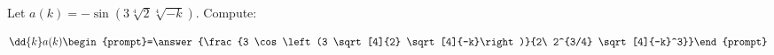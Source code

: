 \documentclass{ximera}
\author{Bart Snapp}
\begin{document}
\begin{exercise}
Let $a(k) = -\sin \left(3 \sqrt[4]{2} \sqrt[4]{-k}\right)$. Compute:

\[
\dd{k}a(k)
\begin{prompt}=\answer{\frac{3 \cos \left(3 \sqrt[4]{2} \sqrt[4]{-k}\right)}{2\ 2^{3/4} \sqrt[4]{-k}^3}}\end{prompt}
\]
\end{exercise}
\end{document}
